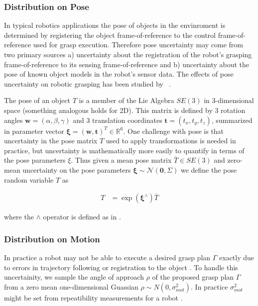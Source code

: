 \documentclass[journal,transmag]{IEEEtran}%
\newcommand{\bw}{\mathbf{w}}
\newcommand{\bt}{\mathbf{t}}
\newcommand{\mN}{\mathcal{N}}
\begin{document}
\subsubsection{Distribution on Pose}
In typical robotics applications the pose of objects in the envinroment is determined by registering the object frame-of-reference to the control frame-of-reference used for grasp execution.
Therefore pose uncertainty may come from two primary sources a) uncertainty about the registration of the robot's grasping frame-of-reference to its sensing frame-of-reference and b) uncertainty about the pose of known object models in the robot's sensor data.
The effects of pose uncertainty on robotic grasping has been studied by ~\cite{}.

The pose of an object $T$ is a member of the Lie Algebra $SE(3)$ in 3-dimensional space (something analogous holds for 2D).
This matrix is defined by 3 rotation angles $\bw = (\alpha, \beta, \gamma)$ and 3 translation coordinates $\bt = (t_x, t_y, t_z)$, summarized in parameter vector $\mathbf{\xi} = (\bw, \bt)^T \in \mathbb{R}^6$.
One challenge with pose is that uncertainty in the pose matrix $T$ used to apply transformations is needed in practice, but uncertainty is mathematically more easily to quantify in terms of the pose parameters $\xi$.
Thus given a mean pose matrix $\bar{T} \in SE(3)$ and zero-mean uncertainty on the pose parameters $\mathbf{\xi} \sim \mN \left( \mathbf{0}, \Sigma \right)$ we define the pose random variable $T$ as

\vspace{-2ex}
\begin{align*}
	T  &= \exp \left( \mathbf{\xi}^{\wedge} \right) \bar{T}
\end{align*}

\noindent where the $\wedge$ operator is defined as in \cite{barfoot2014Pose}.

 
 \subsubsection{Distribution on Motion}
 In practice a robot may not be able to execute a desired
grasp plan $\Gamma$ exactly due to errors in trajectory following or
registration to the object \cite{kehoe2012estimating}. To handle this uncertainity, we sample the angle of approach $\rho$ of the proposed grasp plan $\Gamma$ from a zero mean one-dimensional Guassian $\rho \sim N(0,\sigma_{mot}^2)$. In practice $\sigma_{mot}^2$ might be set from repeatibility measurements for a robot \cite{mooring1986determination}.
\end{document}
